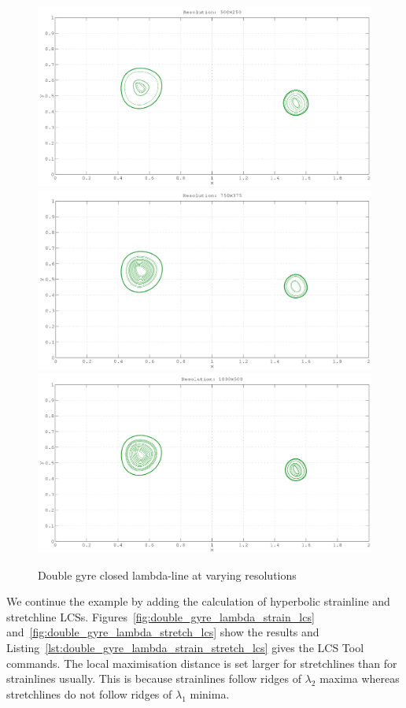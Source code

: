 \documentclass{article}
\begin{document}
\begin{figure}[hbt]
  \centering
  \includegraphics[width=.8\textwidth]{graphics/double_gyre/lambda_lcs_convergence_500}
\includegraphics[width=.8\textwidth]{graphics/double_gyre/lambda_lcs_convergence_750}
\includegraphics[width=.8\textwidth]{graphics/double_gyre/lambda_lcs_convergence_1000}
  \caption{Double gyre closed lambda-line at varying resolutions}
  \label{fig:double_gyre_lambda_lcs_convergence}
\end{figure}

We continue the example by adding the calculation of hyperbolic strainline and stretchline LCSs. Figures~\ref{fig:double_gyre_lambda_strain_lcs} and~\ref{fig:double_gyre_lambda_stretch_lcs} show the results and Listing~\ref{lst:double_gyre_lambda_strain_stretch_lcs} gives the LCS Tool commands. The local maximisation distance is set larger for stretchlines than for strainlines usually. This is because strainlines follow ridges of $\lambda_2$ maxima whereas stretchlines do not follow ridges of $\lambda_1$ minima.
\end{document}
